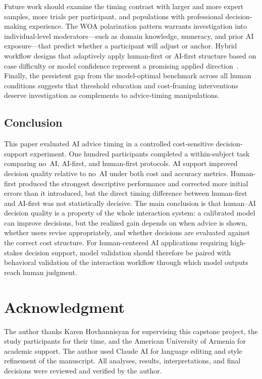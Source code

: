 \documentclass[conference]{IEEEtran}
\begin{document}
Future work should examine the timing contrast with larger and more
expert samples, more trials per participant, and populations with
professional decision-making experience. The WOA polarization pattern
warrants investigation into individual-level moderators---such as domain
knowledge, numeracy, and prior AI exposure---that predict whether a
participant will adjust or anchor. Hybrid workflow designs that adaptively
apply human-first or AI-first structure based on case difficulty or model
confidence represent a promising applied direction~\cite{mozannar2020consistent}.
Finally, the persistent gap from the model-optimal benchmark across all
human conditions suggests that threshold education and cost-framing
interventions deserve investigation as complements to advice-timing
manipulations.

\subsection{Conclusion}

This paper evaluated AI advice timing in a controlled cost-sensitive
decision-support experiment. One hundred participants completed a
within-subject task comparing no~AI, AI-first, and human-first protocols.
AI support improved decision quality relative to no~AI under both cost
and accuracy metrics. Human-first produced the strongest descriptive
performance and corrected more initial errors than it introduced, but the
direct timing difference between human-first and AI-first was not
statistically decisive. The main conclusion is that human--AI decision
quality is a property of the whole interaction system: a calibrated
model can improve decisions, but the realized gain depends on when advice
is shown, whether users revise appropriately, and whether decisions are
evaluated against the correct cost structure. For human-centered AI
applications requiring high-stakes decision support, model validation
should therefore be paired with behavioral validation of the interaction
workflow through which model outputs reach human judgment.


\section*{Acknowledgment}

The author thanks Karen Hovhannisyan for supervising this capstone project,
the study participants for their time, and the American University of
Armenia for academic support. The author used Claude AI for language
editing and style refinement of the manuscript. All analyses, results,
interpretations, and final decisions were reviewed and verified by the
author.
\end{document}
